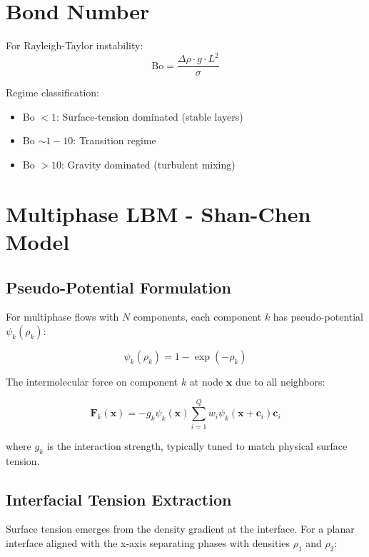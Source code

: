 \section{Bond Number}

For Rayleigh-Taylor instability:
\begin{equation}
\mathrm{Bo} = \frac{\Delta\rho \cdot g \cdot L^2}{\sigma}
\end{equation}

Regime classification:
\begin{itemize}
    \item Bo $< 1$: Surface-tension dominated (stable layers)
    \item Bo $\sim 1-10$: Transition regime
    \item Bo $> 10$: Gravity dominated (turbulent mixing)
\end{itemize}

\section{Multiphase LBM - Shan-Chen Model}

\subsection{Pseudo-Potential Formulation}

For multiphase flows with $N$ components, each component $k$ has pseudo-potential $\psi_k(\rho_k)$:

\begin{equation}
\psi_k(\rho_k) = 1 - \exp(-\rho_k)
\end{equation}

The intermolecular force on component $k$ at node $\mathbf{x}$ due to all neighbors:

\begin{equation}
\mathbf{F}_k(\mathbf{x}) = -g_k \psi_k(\mathbf{x}) \sum_{i=1}^{Q} w_i \psi_k(\mathbf{x} + \mathbf{c}_i) \mathbf{c}_i
\end{equation}

where $g_k$ is the interaction strength, typically tuned to match physical surface tension.

\subsection{Interfacial Tension Extraction}

Surface tension emerges from the density gradient at the interface. For a planar interface aligned with the x-axis separating phases with densities $\rho_1$ and $\rho_2$:

